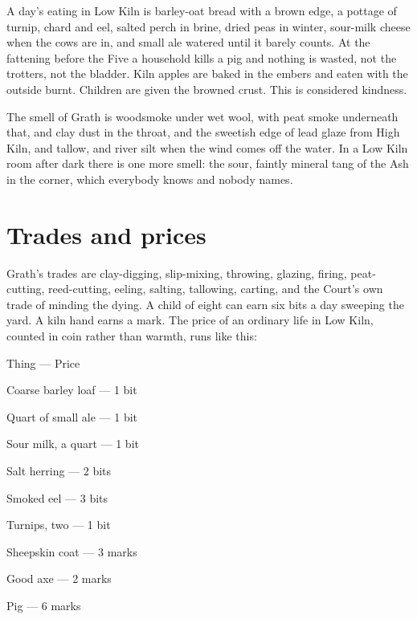 \documentclass{design/chronicle}
\begin{document}
A day’s eating in Low Kiln is barley-oat bread with a brown edge, a pottage of turnip, chard and eel, salted perch in brine, dried peas in winter, sour-milk cheese when the cows are in, and small ale watered until it barely counts. At the fattening before the Five a household kills a pig and nothing is wasted, not the trotters, not the bladder. Kiln apples are baked in the embers and eaten with the outside burnt. Children are given the browned crust. This is considered kindness.

The smell of Grath is woodsmoke under wet wool, with peat smoke underneath that, and clay dust in the throat, and the sweetish edge of lead glaze from High Kiln, and tallow, and river silt when the wind comes off the water. In a Low Kiln room after dark there is one more smell: the sour, faintly mineral tang of the Ash in the corner, which everybody knows and nobody names.

\section*{Trades and prices}

Grath’s trades are clay-digging, slip-mixing, throwing, glazing, firing, peat-cutting, reed-cutting, eeling, salting, tallowing, carting, and the Court’s own trade of minding the dying. A child of eight can earn six bits a day sweeping the yard. A kiln hand earns a mark. The price of an ordinary life in Low Kiln, counted in coin rather than warmth, runs like this:

Thing — Price\par

Coarse barley loaf — 1 bit\par

Quart of small ale — 1 bit\par

Sour milk, a quart — 1 bit\par

Salt herring — 2 bits\par

Smoked eel — 3 bits\par

Turnips, two — 1 bit\par

Sheepskin coat — 3 marks\par

Good axe — 2 marks\par

Pig — 6 marks\par
\end{document}
